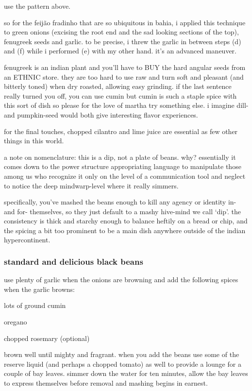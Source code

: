 use the pattern above.

so for the feij\~{a}o fradinho that are so ubiquitous in bahia, i
applied this technique to green onions (excising the root end and the
sad looking sections of the top), fenugreek seeds and garlic. to be
precise, i threw the garlic in between steps (d) and (f) while i
performed (e) with my other hand. it's an advanced maneuver.

fenugreek is an indian plant and you'll have to BUY the hard angular
seeds from an ETHNIC store. they are too hard to use raw and turn soft
and pleasant (and bitterly toned) when dry roasted, allowing easy
grinding. if the last sentence really turned you off, you can use
cumin but cumin is such a staple spice with this sort of dish so
please for the love of martha try something else. i imagine dill- and
pumpkin-seed would both give interesting flavor experiences.

for the final touches, chopped cilantro and lime juice are essential
as few other things in this world.

a note on nomenclature: this is a dip, not a plate of beans. why?
essentially it comes down to the power structure appropriating
language to manipulate those among us who recognize it only on the
level of a communication tool and neglect to notice the deep
mindwarp-level where it really simmers.

specifically, you've mashed the beans enough to kill any agency or
identity in- and for- themselves, so they just default to a mashy
hive-mind we call `dip'. the consistency is thick and starchy enough
to balance heftily on a bread or chip, and the spicing a bit too
prominent to be a main dish anywhere outside of the indian
hypercontinent.

\subsubsection{standard and delicious black beans}

use plenty of garlic when the onions are browning and add the
following spices when the garlic browns:

\begin{ingredients}
  \item lots of ground cumin
  \item oregano
  \item chopped rosemary (optional)
\end{ingredients}

brown well until mighty and fragrant. when you add the beans use some
of the reserve liquid (and perhaps a chopped tomato) as well to
provide a lounge for a couple of bay leaves. simmer down the water for
ten minutes, allow the bay leaves to express themselves before removal
and mashing begins in earnest.

